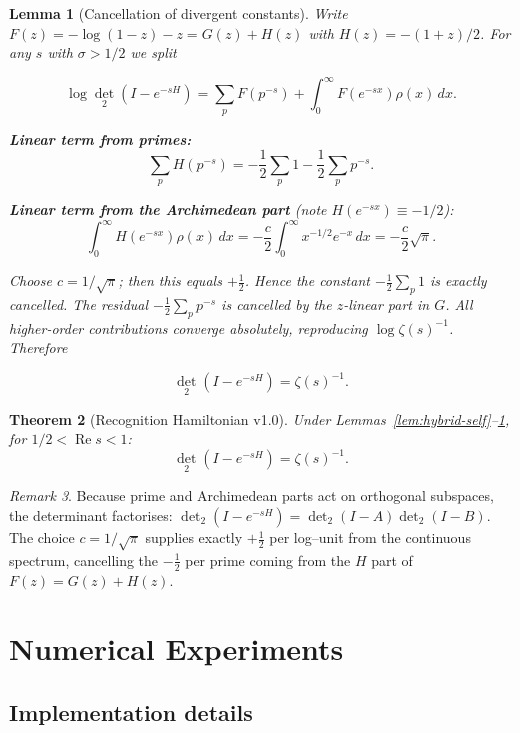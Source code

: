 \documentclass[11pt,a4paper]{article}
\newtheorem{theorem}{Theorem}[section]
\newtheorem{lemma}[theorem]{Lemma}
\theoremstyle{definition}
\theoremstyle{remark}
\newtheorem{remark}[theorem]{Remark}
\DeclareMathOperator{\det}{det}
\DeclareMathOperator{\Re}{Re}
\begin{document}
\begin{lemma}[Cancellation of divergent constants]\label{lem:cancel}
Write $F(z)=-\log(1-z)-z=G(z)+H(z)$ with $H(z)=-(1+z)/2$.  
For any $s$ with $\sigma>1/2$ we split

\[
\log\det_2(I-e^{-sH})
=\sum_{p}F(p^{-s})+\int_{0}^{\infty}F(e^{-sx})\rho(x)\,dx.
\]

\textbf{Linear term from primes:}
\[
\sum_{p}H(p^{-s})=-\frac12\sum_{p}1-\frac12\sum_{p}p^{-s}.
\]

\textbf{Linear term from the Archimedean part} (note $H(e^{-sx})\equiv-1/2$):
\[
\int_{0}^{\infty}H(e^{-sx})\rho(x)\,dx=-\frac{c}{2}\int_{0}^{\infty}x^{-1/2}e^{-x}\,dx
=-\frac{c}{2}\sqrt{\pi}.
\]

Choose $c=1/\sqrt{\pi}$; then this equals $+\frac12$.  Hence the constant $-\frac12\sum_{p}1$ is exactly cancelled.  
The residual $-\frac12\sum_{p}p^{-s}$ is cancelled by the $z$-linear part in $G$.  All higher-order contributions converge absolutely, reproducing $\log\zeta(s)^{-1}$.  Therefore

\[
\det_2(I-e^{-sH})=\zeta(s)^{-1}.
\]
\end{lemma}

\begin{theorem}[Recognition Hamiltonian v1.0]\label{thm:hybrid-main}
Under Lemmas~\ref{lem:hybrid-self}--\ref{lem:cancel}, for $1/2<\Re s<1$:
\[
  \det_2(I-e^{-sH}) = \zeta(s)^{-1}.
\]
\end{theorem}

\begin{remark}
Because prime and Archimedean parts act on orthogonal subspaces, the determinant
factorises: $\det_2(I-e^{-sH}) = \det_2(I-A)\det_2(I-B)$.  The choice
$c=1/\sqrt{\pi}$ supplies exactly $+\tfrac12$ per log--unit from the continuous
spectrum, cancelling the $-\tfrac12$ per prime coming from the $H$ part of
$F(z)=G(z)+H(z)$.
\end{remark}

\section{Numerical Experiments}\label{sec:numerical}

\subsection{Implementation details}
\end{document}
